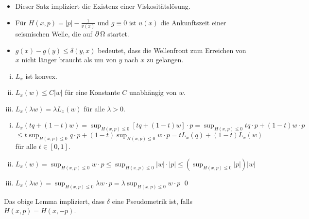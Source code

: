 \begin{bem} \label{bem_30}
	\begin{itemize}
		\item Dieser Satz impliziert die Existenz einer Viskositätslösung. \marginnote{[30]}
		\item Für $H(x,p) = |p| - \frac{1}{v(x)}$ und $g \equiv 0$ ist $u(x)$ die Ankunftszeit einer seismischen Welle, die auf $\operatorname{\partial} \Omega$ startet.
		\item $g(x) - g(y) \leq \delta(y,x)$ bedeutet, dass die Wellenfront zum Erreichen von $x$ nicht länger braucht als um von $y$ nach $x$ zu gelangen.
	\end{itemize}
\end{bem}
	
\begin{lemma} \label{bem_31}
	\begin{enumerate}[(i)]
		\item $L_x$ ist konvex. \marginnote{[31]}
		\item $L_x(w) \leq C|w|$ für eine Konstante $C$ unabhängig von $w$.
		\item $L_x(\lambda w) = \lambda L_x(w)$ für alle $\lambda > 0$.
	\end{enumerate}
\end{lemma}
	
	\begin{enumerate}[(i)]
		\item $L_x(tq+(1-t)w) = \sup_{H(x,p) \leq 0} [tq + (1-t)w] \cdot p = \sup_{H(x,p) \leq 0} tq \cdot p + (1-t)w \cdot p$ \\
		$\leq t \sup_{H(x,p) \leq 0} q \cdot p + (1-t) \sup_{H(x,p) \leq 0} w \cdot p = tL_x(q) + (1-t)L_x(w)$ für alle $t \in [0,1]$.
		\item $L_x(w) = \sup_{H(x,p) \leq 0} w \cdot p \leq \sup_{H(x,p) \leq 0} |w| \cdot |p| \leq (\sup_{H(x,p) \leq 0} |p|) |w|$
		\item $L_x(\lambda w) = \sup_{H(x,p) \leq 0} \lambda w \cdot p = \lambda \sup_{H(x,p) \leq 0} w \cdot p$ \qed
	\end{enumerate}
	
\begin{bem} \label{bem_32}
	Das obige Lemma impliziert, dass $\delta$ eine Pseudometrik ist, falls $H(x,p) = H(x,-p)$. \marginnote{[32]}
\end{bem}
	
